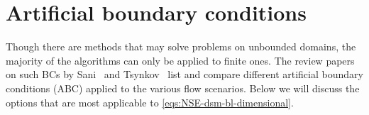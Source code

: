 \documentclass{article}
\numberwithin{equation}{section}
\begin{document}
%
%
%
%
\pagebreak
\section{Artificial boundary conditions}\label{sec:artificial-bc}
Though there are methods that may solve problems on unbounded domains, the majority of the algorithms can only be applied to finite ones. 
The review papers on such BCs by Sani~\cite{Sani:1994} and Tsynkov~\cite{Tsynkov:1998} list and compare different artificial boundary conditions (ABC) applied to the various flow scenarios. Below we will discuss the options that are most applicable to \cref{eqs:NSE-dsm-bl-dimensional}. 
\end{document}
